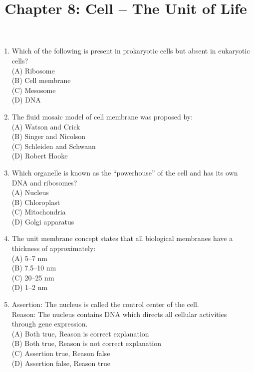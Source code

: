 \documentclass{article}
\begin{document}
\title{Chapter 8: Cell -- The Unit of Life}
\date{}
\maketitle

\begin{enumerate}[label=Q\arabic*.]

\item Which of the following is present in prokaryotic cells but absent in eukaryotic cells?
\\(A) Ribosome
\\(B) Cell membrane
\\(C) Mesosome
\\(D) DNA

\item The fluid mosaic model of cell membrane was proposed by:
\\(A) Watson and Crick
\\(B) Singer and Nicolson
\\(C) Schleiden and Schwann
\\(D) Robert Hooke

\item Which organelle is known as the ``powerhouse'' of the cell and has its own DNA and ribosomes?
\\(A) Nucleus
\\(B) Chloroplast
\\(C) Mitochondria
\\(D) Golgi apparatus

\item The unit membrane concept states that all biological membranes have a thickness of approximately:
\\(A) 5--7 nm
\\(B) 7.5--10 nm
\\(C) 20--25 nm
\\(D) 1--2 nm

\item Assertion: The nucleus is called the control center of the cell.\\
Reason: The nucleus contains DNA which directs all cellular activities through gene expression.
\\(A) Both true, Reason is correct explanation
\\(B) Both true, Reason is not correct explanation
\\(C) Assertion true, Reason false
\\(D) Assertion false, Reason true


\end{enumerate}
\end{document}
